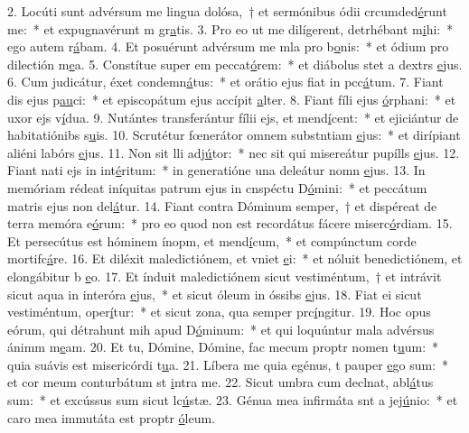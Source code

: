 2. Locúti sunt advérsum me lingua dolósa,~† et sermónibus ódii crcumded\uline{é}runt me:~* et expugnavérunt m gr\uline{a}tis.
3. Pro eo ut me dilígerent, detrhébant m\uline{i}hi:~* ego autem r\uline{á}bam.
4. Et posuérunt advérsum me mla pro b\uline{o}nis:~* et ódium pro dilectión m\uline{e}a.
5. Constítue super em peccat\uline{ó}rem:~* et diábolus stet a dextrs \uline{e}jus.
6. Cum judicátur, éxet condemn\uline{á}tus:~* et orátio ejus fiat in pcc\uline{á}tum.
7. Fiant dis ejus p\uline{au}ci:~* et episcopátum ejus accípit \uline{a}lter.
8. Fiant fíli ejus \uline{ó}rphani:~* et uxor ejs v\uline{í}dua.
9. Nutántes transferántur fílii ejs, et mend\uline{í}cent:~* et ejiciántur de habitatiónibs s\uline{u}is.
10. Scrutétur fœnerátor omnem substntiam \uline{e}jus:~* et dirípiant aliéni labórs \uline{e}jus.
11. Non sit lli adj\uline{ú}tor:~* nec sit qui misereátur pupílls \uline{e}jus.
12. Fiant nati ejs in int\uline{é}ritum:~* in generatióne una deleátur nomn \uline{e}jus.
13. In memóriam rédeat iníquitas patrum ejus in cnspéctu D\uline{ó}mini:~* et peccátum matris ejus non del\uline{á}tur.
14. Fiant contra Dóminum semper,~† et dispéreat de terra memóra e\uline{ó}rum:~* pro eo quod non est recordátus fácere miserc\uline{ó}rdiam.
15. Et persecútus est hóminem ínopm, et mend\uline{í}cum,~* et compúnctum corde mortifc\uline{á}re.
16. Et diléxit maledictiónem, et vniet \uline{e}i:~* et nóluit benedictiónem, et elongábitur b \uline{e}o.
17. Et índuit maledictiónem sicut vestiméntum,~† et intrávit sicut aqua in interóra \uline{e}jus,~* et sicut óleum in óssibs \uline{e}jus.
18. Fiat ei sicut vestiméntum,  oper\uline{í}tur:~* et sicut zona, qua semper prc\uline{í}ngitur.
19. Hoc opus eórum, qui détrahunt mih apud D\uline{ó}minum:~* et qui loquúntur mala advérsus ánimm m\uline{e}am.
20. Et tu, Dómine, Dómine, fac mecum proptr nomen t\uline{u}um:~* quia suávis est misericórdi t\uline{u}a.
21. Líbera me quia egénus, t pauper \uline{e}go sum:~* et cor meum conturbátum st \uline{i}ntra me.
22. Sicut umbra cum declnat, abl\uline{á}tus sum:~* et excússus sum sicut lc\uline{ú}stæ.
23. Génua mea infirmáta snt a jej\uline{ú}nio:~* et caro mea immutáta est proptr \uline{ó}leum.
